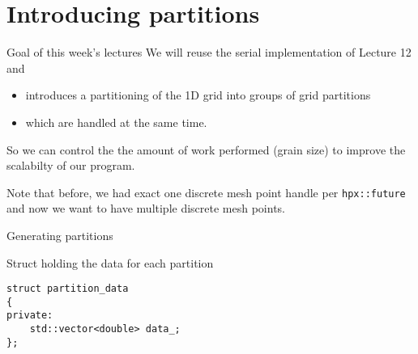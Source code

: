 \documentclass[12pt,t]{beamer}
\begin{document}
\section{Introducing partitions}

\begin{frame}{Goal of this week's lectures}
We will reuse the serial implementation of Lecture 12 and

\begin{itemize}
\item introduces a partitioning of the 1D grid into groups of grid partitions
\item which are handled at the same time.
\end{itemize}
So we can control the the amount of work performed (grain size) to improve the scalabilty of our program. \\
\vspace{0.25cm}

Note that before, we had exact one discrete mesh point handle per \lstinline|hpx::future| and now we want to have multiple discrete mesh points. 
\end{frame}

\begin{frame}[fragile]{Generating partitions}

\begin{center}
\end{center}

\begin{block}{Struct holding the data for each partition}
\begin{lstlisting}
struct partition_data
{
private:
    std::vector<double> data_;
};
\end{lstlisting}
\end{block}

\end{frame}
\end{document}
